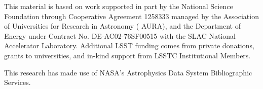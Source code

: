 \acknowledgments
This material is based on work supported in part by the  {National Science Foundation} through Cooperative Agreement 1258333 managed by the  {Association of Universities for Research in Astronomy} ( {AURA}), and the  {Department of Energy} under  {Contract} No.  {DE}-AC02-76SF00515 with the  {SLAC} National Accelerator Laboratory. Additional LSST funding comes from private donations, grants to universities, and in-kind support from LSSTC Institutional Members.

This research has made use of  NASA's Astrophysics Data System Bibliographic Services.